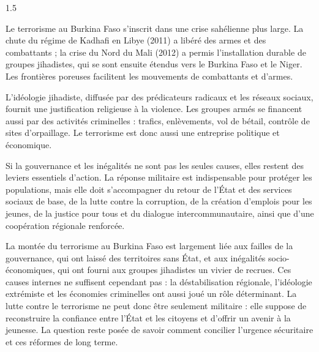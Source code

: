 \documentclass[12pt]{article}
\begin{document}
\begin{spacing}{1.5}


Le terrorisme au Burkina Faso s'inscrit dans une crise sahélienne plus large. La chute du régime de Kadhafi en Libye (2011) a libéré des armes et des combattants ; la crise du Nord du Mali (2012) a permis l'installation durable de groupes jihadistes, qui se sont ensuite étendus vers le Burkina Faso et le Niger. Les frontières poreuses facilitent les mouvements de combattants et d'armes.

L'idéologie jihadiste, diffusée par des prédicateurs radicaux et les réseaux sociaux, fournit une justification religieuse à la violence. Les groupes armés se financent aussi par des activités criminelles : trafics, enlèvements, vol de bétail, contrôle de sites d'orpaillage. Le terrorisme est donc aussi une entreprise politique et économique.

Si la gouvernance et les inégalités ne sont pas les seules causes, elles restent des leviers essentiels d'action. La réponse militaire est indispensable pour protéger les populations, mais elle doit s'accompagner du retour de l'État et des services sociaux de base, de la lutte contre la corruption, de la création d'emplois pour les jeunes, de la justice pour tous et du dialogue intercommunautaire, ainsi que d'une coopération régionale renforcée.


La montée du terrorisme au Burkina Faso est largement liée aux failles de la gouvernance, qui ont laissé des territoires sans État, et aux inégalités socio-économiques, qui ont fourni aux groupes jihadistes un vivier de recrues. Ces causes internes ne suffisent cependant pas : la déstabilisation régionale, l'idéologie extrémiste et les économies criminelles ont aussi joué un rôle déterminant. La lutte contre le terrorisme ne peut donc être seulement militaire : elle suppose de reconstruire la confiance entre l'État et les citoyens et d'offrir un avenir à la jeunesse. La question reste posée de savoir comment concilier l'urgence sécuritaire et ces réformes de long terme.

\end{spacing}
\end{document}
